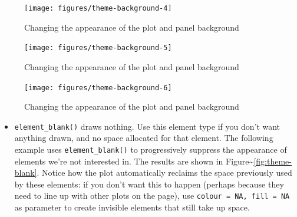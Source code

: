 \begin{figure}
\texttt{[image: figures/theme-background-4]} \caption{Changing the appearance of the plot and panel background\label{fig:theme-background4}}
\end{figure}

\begin{Shaded}
\begin{Highlighting}[]
\StringTok{ }\NormalTok{(} \NormalTok{(} \NormalTok{))}
\end{Highlighting}
\end{Shaded}

\begin{figure}
\texttt{[image: figures/theme-background-5]} \caption{Changing the appearance of the plot and panel background\label{fig:theme-background5}}
\end{figure}

\begin{Shaded}
\begin{Highlighting}[]
\StringTok{ }\NormalTok{(} \NormalTok{(} \NormalTok{))}
\end{Highlighting}
\end{Shaded}

\begin{figure}
\texttt{[image: figures/theme-background-6]} \caption{Changing the appearance of the plot and panel background\label{fig:theme-background6}}
\end{figure}

\begin{itemize}
\itemsep1pt\parskip0pt
\item
  \texttt{element\_blank()} draws nothing. Use this element type if you
  don't want anything drawn, and no space allocated for that element.
  The following example uses \texttt{element\_blank()} to progressively
  suppress the appearance of elements we're not interested in. The
  results are shown in Figure\textasciitilde{}\ref{fig:theme-blank}.
  Notice how the plot automatically reclaims the space previously used
  by these elements: if you don't want this to happen (perhaps because
  they need to line up with other plots on the page), use
  \texttt{colour = NA, fill = NA} as parameter to create invisible
  elements that still take up space. 
\end{itemize}

